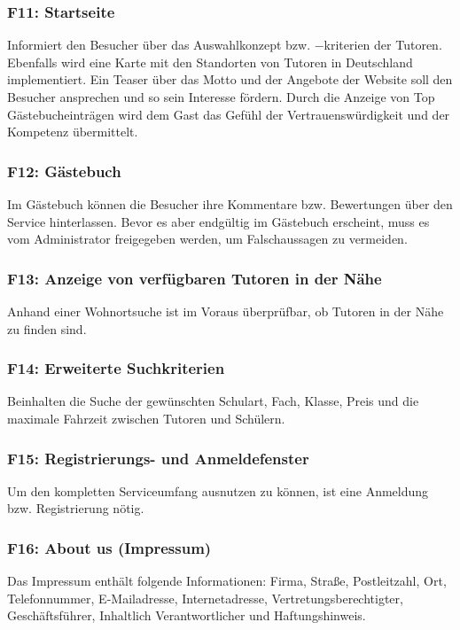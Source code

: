 \documentclass[10pt,a4paper]{scrartcl}
\begin{document}
\subsubsection*{F11: Startseite}

Informiert den Besucher über das Auswahlkonzept bzw. $-$kriterien der Tutoren. Ebenfalls wird eine Karte mit den Standorten von Tutoren in Deutschland implementiert. Ein Teaser über das Motto und der Angebote der Website soll den Besucher ansprechen und so sein Interesse fördern. Durch die Anzeige von Top Gästebucheinträgen wird dem Gast das Gefühl der Vertrauenswürdigkeit und der Kompetenz übermittelt. 

\subsubsection*{F12: Gästebuch}

Im Gästebuch können die Besucher ihre Kommentare bzw. Bewertungen über den Service hinterlassen. Bevor es aber endgültig im Gästebuch erscheint, muss es vom Administrator freigegeben werden, um Falschaussagen zu vermeiden. 

\subsubsection*{F13: Anzeige von verfügbaren Tutoren in der Nähe}
Anhand einer Wohnortsuche ist im Voraus überprüfbar, ob Tutoren in der Nähe zu finden sind.

\subsubsection*{F14: Erweiterte Suchkriterien}

Beinhalten die Suche der gewünschten Schulart, Fach, Klasse, Preis und die maximale Fahrzeit zwischen Tutoren und Schülern. 

\subsubsection*{F15: Registrierungs- und Anmeldefenster}

Um den kompletten Serviceumfang ausnutzen zu können, ist eine Anmeldung bzw. Registrierung nötig.

\subsubsection*{F16: About us (Impressum)}

Das Impressum enthält folgende Informationen: Firma, Straße, Postleitzahl, Ort, Telefonnummer, E-Mailadresse, Internetadresse, Vertretungsberechtigter, \\ Geschäftsführer, Inhaltlich Verantwortlicher und Haftungshinweis. 
\end{document}
